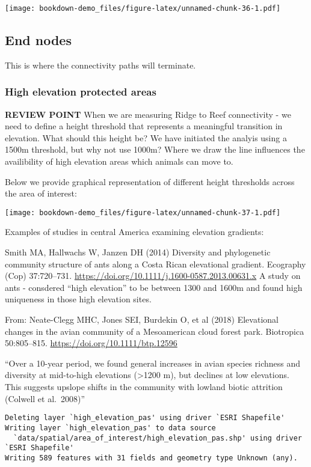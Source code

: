 \documentclass[
]{book}
\begin{document}
\texttt{[image: bookdown-demo\_files/figure-latex/unnamed-chunk-36-1.pdf]}

\hypertarget{end-nodes}{%
\subsection{End nodes}\label{end-nodes}}

This is where the connectivity paths will terminate.

\hypertarget{high-elevation-protected-areas}{%
\subsubsection{High elevation protected areas}\label{high-elevation-protected-areas}}

\textbf{REVIEW POINT} When we are measuring Ridge to Reef connectivity - we need to define a height threshold that represents a meaningful transition in elevation. What should this height be? We have initiated the analyis using a 1500m threshold, but why not use 1000m? Where we draw the line influences the availibility of high elevation areas which animals can move to.

Below we provide graphical representation of different height thresholds across the area of interest:

\texttt{[image: bookdown-demo\_files/figure-latex/unnamed-chunk-37-1.pdf]}

Examples of studies in central America examining elevation gradients:

Smith MA, Hallwachs W, Janzen DH (2014) Diversity and phylogenetic community structure of ants along a Costa Rican elevational gradient. Ecography (Cop) 37:720--731. \url{https://doi.org/10.1111/j.1600-0587.2013.00631.x}
A study on ants - consdered ``high elevation'' to be between 1300 and 1600m and found high uniqueness in those high elevation sites.

From: Neate-Clegg MHC, Jones SEI, Burdekin O, et al (2018) Elevational changes in the avian community of a Mesoamerican cloud forest park. Biotropica 50:805--815. \url{https://doi.org/10.1111/btp.12596}

``Over a 10-year period, we found general increases in avian species richness and diversity at mid-to-high elevations (\textgreater1200 m), but declines at low elevations. This suggests upslope shifts in the community with lowland biotic attrition (Colwell et al.~2008)''

\begin{verbatim}
Deleting layer `high_elevation_pas' using driver `ESRI Shapefile'
Writing layer `high_elevation_pas' to data source 
  `data/spatial/area_of_interest/high_elevation_pas.shp' using driver `ESRI Shapefile'
Writing 589 features with 31 fields and geometry type Unknown (any).
\end{verbatim}
\end{document}
